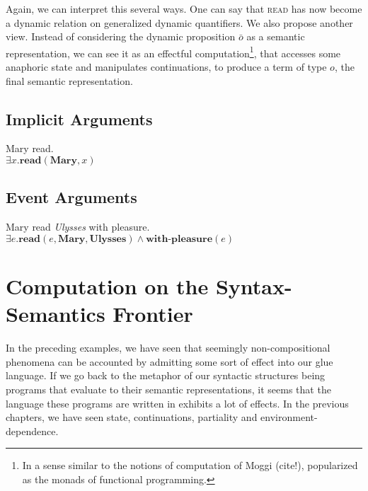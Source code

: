 \documentclass{article}
\begin{document}
Again, we can interpret this several ways. One can say that \textsc{read} has
now become a dynamic relation on generalized dynamic quantifiers. We also
propose another view. Instead of considering the dynamic proposition $\bar{o}$
as a semantic representation, we can see it as an effectful
computation\footnote{In a sense similar to the notions of computation of Moggi
  (cite!), popularized as the monads of functional programming.}, that
accesses some anaphoric state and manipulates continuations, to produce a term
of type $o$, the final semantic representation.

\subsection{Implicit Arguments}

\begin{exe}
  \ex \label{ex:implicit} Mary read. \\
  $\exists x. \textbf{read}(\textbf{Mary}, x)$
\end{exe}



\subsection{Event Arguments}

\begin{exe}
  \ex \label{ex:event} Mary read \emph{Ulysses} with pleasure. \\
  $\exists e. \textbf{read}(e, \textbf{Mary}, \textbf{Ulysses}) \land \textbf{with-pleasure}(e)$
\end{exe}



\section{Computation on the Syntax-Semantics Frontier}

In the preceding examples, we have seen that seemingly non-compositional
phenomena can be accounted by admitting some sort of effect into our glue
language. If we go back to the metaphor of our syntactic structures being
programs that evaluate to their semantic representations, it seems that the
language these programs are written in exhibits a lot of effects. In the
previous chapters, we have seen state, continuations, partiality and
environment-dependence.
\end{document}
